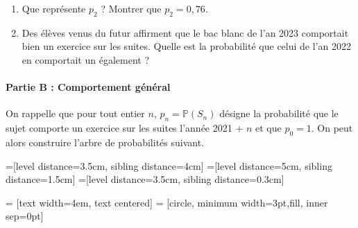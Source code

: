 \documentclass[11pt,fleqn, openany]{book} %
\begin{document}
\begin{exercise}
\begin{enumerate}
\begin{center}
\end{center}

    
    \item Que représente $p_2$ ? Montrer que $p_2=0,76$.
    \item Des élèves venus du futur affirment que le bac blanc de l'an 2023 comportait bien un exercice sur les suites. Quelle est la probabilité que celui de l'an 2022 en comportait un également ?
\end{enumerate}

\newpage

\paragraph{Partie B : Comportement général}

On rappelle que pour tout entier $n$, $p_n=\mathbb{P}(S_n)$ désigne la probabilité que le sujet comporte un exercice sur les suites l'année 2021 + $n$ et que $p_0=1$. On peut alors construire l'arbre de probabilités suivant.


    
    =[level distance=3.5cm, sibling distance=4cm]
=[level distance=5cm, sibling distance=1.5cm]
=[level distance=3.5cm, sibling distance=0.3cm]

 = [text width=4em, text centered]
 = [circle, minimum width=3pt,fill, inner sep=0pt]



\end{exercise}
\end{document}
